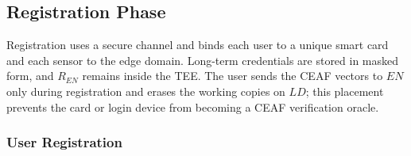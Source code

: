 \documentclass[cmc,article,submit,moreauthors,pdftex]{Definitions/tsp}
\begin{document}
\subsection{Registration Phase}\label{sec:registration}

Registration uses a secure channel and binds each user to a unique smart card and each sensor to the edge domain. Long-term credentials are stored in masked form, and $R_{EN}$ remains inside the TEE. The user sends the CEAF vectors to $EN$ only during registration and erases the working copies on $LD$; this placement prevents the card or login device from becoming a CEAF verification oracle.

\subsubsection{User Registration}
\end{document}
